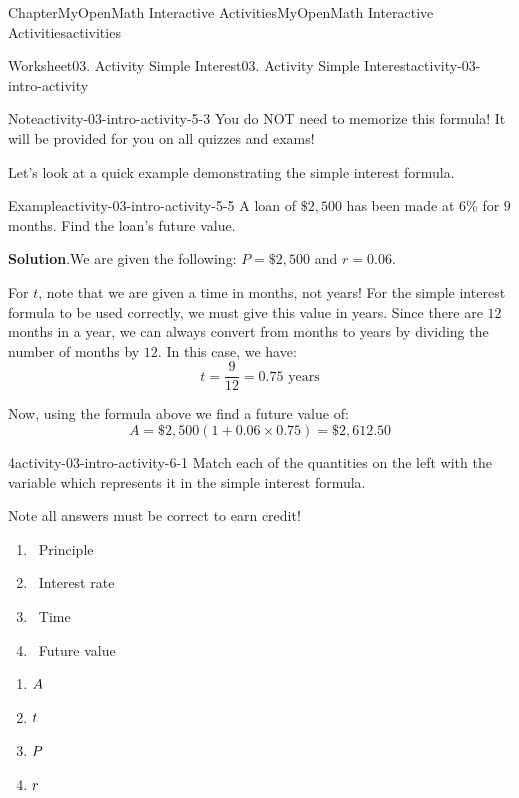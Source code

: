 \documentclass[oneside,10pt,]{book}
\newcommand{\blocktitlefont}{\relax}
\begin{document}
\begin{chapterptx}{Chapter}{MyOpenMath Interactive Activities}{}{MyOpenMath Interactive Activities}{}{}{activities}
\begin{worksheet-section}{Worksheet}{03. Activity Simple Interest}{}{03. Activity Simple Interest}{}{}{activity-03-intro-activity}
\begin{note}{Note}{}{activity-03-intro-activity-5-3}
You do NOT need to memorize this formula! It will be provided for you on all quizzes and exams!%
\end{note}
Let's look at a quick example demonstrating the simple interest formula.%
\begin{example}{Example}{}{activity-03-intro-activity-5-5}%
A loan of \(\$2,500\) has been made at \(6\%\) for \(9\) months. Find the loan’s future value.%
\par\smallskip%
\noindent\textbf{\blocktitlefont Solution}.\hypertarget{activity-03-intro-activity-5-5-2}{}\quad{}We are given the following: \(P = \$2,500\) and \(r = 0.06\).%
\par
For \(t\), note that we are given a time in months, not years! For the simple interest formula to be used correctly, we must give this value in years. Since there are \(12\) months in a year, we can always convert from months to years by dividing the number of months by \(12\). In this case, we have:%
\begin{equation*}
t = \frac{9}{12} = 0.75 \text{ years}
\end{equation*}
%
\par
Now, using the formula above we find a future value of:%
\begin{equation*}
A = \$2,500(1 + 0.06 \times 0.75) = \$2,612.50
\end{equation*}
%
\end{example}
\clearpage
\begin{divisionexercise}{4}{}{}{activity-03-intro-activity-6-1}%
Match each of the quantities on the left with the variable which represents it in the simple interest formula.%
\par
Note all answers must be correct to earn credit!%
\par
%
\begin{enumerate}[label={(\alph*)}]
\item{} Principle%
\item{} Interest rate%
\item{} Time%
\item{} Future value%
\end{enumerate}
%
\par
%
\begin{enumerate}[label={(\alph*)}]
\item{}\(\displaystyle \displaystyle{A}\)%
\item{}\(\displaystyle \displaystyle{t}\)%
\item{}\(\displaystyle \displaystyle{P}\)%
\item{}\(\displaystyle \displaystyle{r}\)%

\end{enumerate}
\end{divisionexercise}
\end{worksheet-section}
\end{chapterptx}
\end{document}
